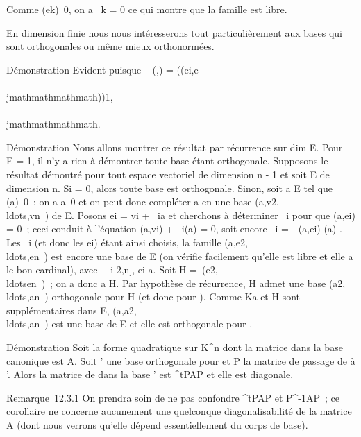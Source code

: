 Comme \Phi(ek)\neq~0, on a \lambda~k =
0 ce qui montre que la famille est libre.

En dimension finie nous nous intéresserons tout particulièrement aux
bases qui sont orthogonales ou même mieux orthonormées.


Démonstration Evident puisque
\mathrmMat~ (\phi,) =
(\phi(ei,e\\\\jmathmathmathmath))1\leqi,\\\\jmathmathmathmath\leqn.


Démonstration Nous allons montrer ce résultat par récurrence sur
dim E. Pour \dim~ E =
1, il n'y a rien à démontrer toute base étant orthogonale. Supposons le
résultat démontré pour tout espace vectoriel de dimension n - 1 et soit
E de dimension n. Si \Phi = 0, alors toute base est orthogonale. Sinon,
soit a \in E tel que \Phi(a)\neq~0~; on a
a\neq~0 et on peut donc compléter a en une base
(a,v2,\\ldots,vn~)
de E. Posons ei = vi + \lambda~ia et cherchons à
déterminer \lambda~i pour que \phi(a,ei) = 0~; ceci conduit à
l'équation \phi(a,vi) + \lambda~i\Phi(a) = 0, soit encore
\lambda~i = - \phi(a,ei) \over \Phi(a) . Les
\lambda~i (et donc les ei) étant ainsi choisis, la famille
(a,e2,\\ldots,en~)
est encore une base de E (on vérifie facilement qu'elle est libre et
elle a le bon cardinal), avec \forall~~i \in {[}2,n{]},
ei \bot a. Soit H =\
\mathrmVect(e2,\\ldotsen~)~;
on a donc a \bot H. Par hypothèse de récurrence, H admet une base
(a2,\\ldots,an~)
orthogonale pour \Phi\textbar{}H (et donc pour \Phi).
Comme Ka et H sont supplémentaires dans E,
(a,a2,\\ldots,an~)
est une base de E et elle est orthogonale pour \phi.


Démonstration Soit \Phi la forme quadratique sur K^n dont la
matrice dans la base canonique  est A. Soit ' une base orthogonale
pour \phi et P la matrice de passage de  à \mathcal{E}'. Alors la matrice de \phi dans
la base \mathcal{E}' est ^tPAP et elle est diagonale.

Remarque~12.3.1 On prendra soin de ne pas confondre ^tPAP et
P^-1AP~; ce corollaire ne concerne aucunement une quelconque
diagonalisabilité de la matrice A (dont nous verrons qu'elle dépend
essentiellement du corps de base).


